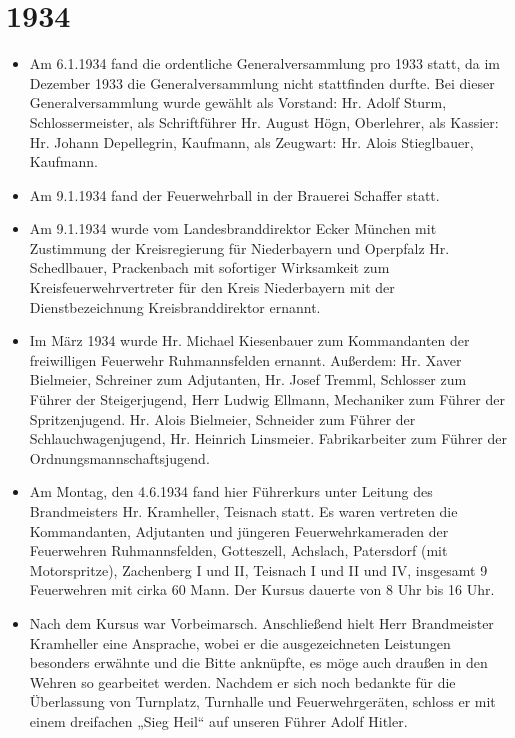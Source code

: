 \documentclass[12pt,a4paper]{book}
\begin{document}
\section*{1934}

\begin{itemize}
\item Am 6.1.1934 fand die ordentliche Generalversammlung pro 1933
statt, da im Dezember 1933 die Generalversammlung nicht stattfinden
durfte. Bei dieser Generalversammlung wurde gewählt als Vorstand: Hr.
Adolf Sturm, Schlossermeister, als Schriftführer Hr. August Högn,
Oberlehrer, als Kassier: Hr. Johann Depellegrin, Kaufmann, als Zeugwart:
Hr. Alois Stieglbauer, Kaufmann.

\item Am 9.1.1934 fand der Feuerwehrball in der Brauerei Schaffer statt.

\item Am 9.1.1934 wurde vom Landesbranddirektor Ecker München mit
Zustimmung der Kreisregierung für Niederbayern und Operpfalz Hr.
Schedlbauer, Prackenbach mit sofortiger Wirksamkeit zum
Kreisfeuerwehrvertreter für den Kreis Niederbayern mit der
Dienstbezeichnung Kreisbranddirektor ernannt.

\item Im März 1934 wurde Hr. Michael Kiesenbauer zum Kommandanten der
freiwilligen Feuerwehr Ruhmannsfelden ernannt. Außerdem: Hr. Xaver
Bielmeier, Schreiner zum Adjutanten, Hr. Josef Tremml, Schlosser zum
Führer der Steigerjugend, Herr Ludwig Ellmann, Mechaniker zum Führer der
Spritzenjugend. Hr. Alois Bielmeier, Schneider zum Führer der
Schlauchwagenjugend, Hr. Heinrich Linsmeier. Fabrikarbeiter zum Führer
der Ordnungsmannschaftsjugend.

\item Am Montag, den 4.6.1934 fand hier Führerkurs unter Leitung des
Brandmeisters Hr. Kramheller, Teisnach statt. Es waren vertreten die
Kommandanten, Adjutanten und jüngeren Feuerwehrkameraden der Feuerwehren
Ruhmannsfelden, Gotteszell, Achslach, Patersdorf (mit Motorspritze),
Zachenberg I und II, Teisnach I und II und IV, insgesamt 9 Feuerwehren
mit cirka 60 Mann. Der Kursus dauerte von 8 Uhr bis 16 Uhr.

\item Nach dem Kursus war Vorbeimarsch. Anschließend hielt Herr
Brandmeister Kramheller eine Ansprache, wobei er die ausgezeichneten
Leistungen besonders erwähnte und die Bitte anknüpfte, es möge auch
draußen in den Wehren so gearbeitet werden. Nachdem er sich noch
bedankte für die Überlassung von Turnplatz, Turnhalle und
Feuerwehrgeräten, schloss er mit einem dreifachen „Sieg Heil“ auf
unseren Führer Adolf Hitler.


\end{itemize}
\end{document}
